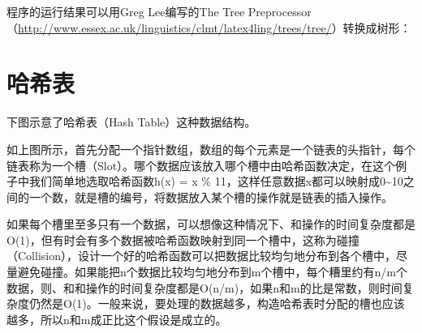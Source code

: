





程序的运行结果可以用Greg Lee编写的The Tree Preprocessor（\url{http://www.essex.ac.uk/linguistics/clmt/latex4ling/trees/tree/}）转换成树形：






\section{哈希表}
%
下图示意了哈希表（Hash Table）这种数据结构。




如上图所示，首先分配一个指针数组，数组的每个元素是一个链表的头指针，每个链表称为一个槽（Slot）。哪个数据应该放入哪个槽中由哈希函数决定，在这个例子中我们简单地选取哈希函数h(x) = x \% 11，这样任意数据x都可以映射成0\textasciitilde{}\BookSplit{}10之间的一个数，就是槽的编号，将数据放入某个槽的操作就是链表的插入操作。



如果每个槽里至多只有一个数据，可以想像这种情况下、和操作的时间复杂度都是O(1)，但有时会有多个数据被哈希函数映射到同一个槽中，这称为碰撞（Collision），设计一个好的哈希函数可以把数据比较均匀地分布到各个槽中，尽量避免碰撞。如果能把n个数据比较均匀地分布到m个槽中，每个糟里约有n/\BookSplit{}m个数据，则、和和操作的时间复杂度都是O(n/\BookSplit{}m)，如果n和m的比是常数，则时间复杂度仍然是O(1)。一般来说，要处理的数据越多，构造哈希表时分配的槽也应该越多，所以n和m成正比这个假设是成立的。



